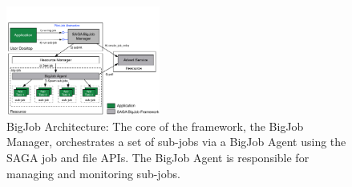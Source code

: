 \documentclass{acm_proc_article-sp}
\newcommand{\up}{\vspace*{-0.3em}}
\newcommand{\jhanote}[1]{ {\textcolor{red} { ***Jha: #1 }}}
\newcommand{\jhanote}[1]{}
\begin{document}
\begin{figure}[ht]
    \centering
    \includegraphics[width=0.45\textwidth]{./bigjob.pdf}
   \caption{BigJob Architecture: The core of the framework, the
      BigJob Manager, orchestrates a set of sub-jobs via a
      BigJob Agent using the SAGA job and file APIs.  The
      BigJob Agent is responsible for managing and monitoring sub-jobs.\up}
   \label{fig:bigjob}
\end{figure}

\end{document}
